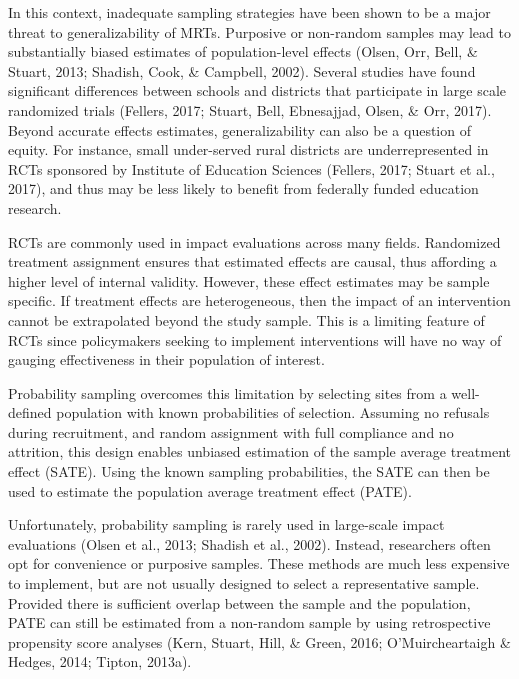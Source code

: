\documentclass[man,floatsintext]{apa6}
\begin{document}
In this context, inadequate sampling strategies have been shown to be a major threat to generalizability of MRTs. Purposive or non-random samples may lead to substantially biased estimates of population-level effects (Olsen, Orr, Bell, \& Stuart, 2013; Shadish, Cook, \& Campbell, 2002). Several studies have found significant differences between schools and districts that participate in large scale randomized trials (Fellers, 2017; Stuart, Bell, Ebnesajjad, Olsen, \& Orr, 2017). Beyond accurate effects estimates, generalizability can also be a question of equity. For instance, small under-served rural districts are underrepresented in RCTs sponsored by Institute of Education Sciences (Fellers, 2017; Stuart et al., 2017), and thus may be less likely to benefit from federally funded education research.

RCTs are commonly used in impact evaluations across many fields. Randomized treatment assignment ensures that estimated effects are causal, thus affording a higher level of internal validity. However, these effect estimates may be sample specific. If treatment effects are heterogeneous, then the impact of an intervention cannot be extrapolated beyond the study sample. This is a limiting feature of RCTs since policymakers seeking to implement interventions will have no way of gauging effectiveness in their population of interest.

Probability sampling overcomes this limitation by selecting sites from a well-defined population with known probabilities of selection. Assuming no refusals during recruitment, and random assignment with full compliance and no attrition, this design enables unbiased estimation of the sample average treatment effect (SATE). Using the known sampling probabilities, the SATE can then be used to estimate the population average treatment effect (PATE).

Unfortunately, probability sampling is rarely used in large-scale impact evaluations (Olsen et al., 2013; Shadish et al., 2002). Instead, researchers often opt for convenience or purposive samples. These methods are much less expensive to implement, but are not usually designed to select a representative sample. Provided there is sufficient overlap between the sample and the population, PATE can still be estimated from a non-random sample by using retrospective propensity score analyses (Kern, Stuart, Hill, \& Green, 2016; O'Muircheartaigh \& Hedges, 2014; Tipton, 2013a).
\end{document}
